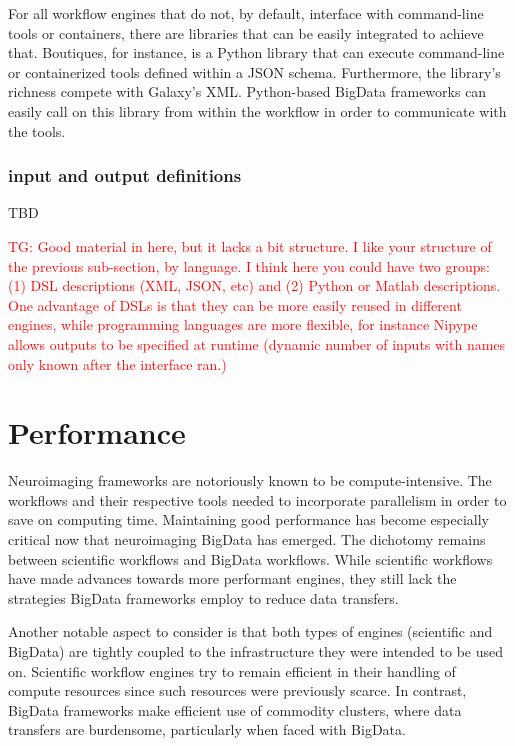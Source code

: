 \documentclass{report}
\newcommand{\tristan}[1]{\textcolor{red}{TG: #1}}
\begin{document}
            For all workflow engines that do not, by default, interface with 
            command-line tools or containers, there are libraries that can be
            easily integrated to achieve that. Boutiques, for instance, is a 
            Python library that can execute command-line or containerized tools
            defined within a JSON schema. Furthermore, the library's richness
            compete with Galaxy's XML. Python-based BigData frameworks can 
            easily call on this library from within the workflow in order to
            communicate with the tools.

            \subsection{input and output definitions}
                TBD

            \tristan{Good material in here, but it lacks a bit structure.
            I like your structure of the previous sub-section, by language. I think
            here you could have two groups: (1) DSL descriptions (XML, JSON, etc) and (2)
            Python or Matlab descriptions. One advantage of DSLs is that they can 
            be more easily reused in different engines, while programming languages
            are more flexible, for instance Nipype allows outputs to be specified
            at runtime (dynamic number of inputs with names only known after
            the interface ran.)}


            
    \chapter{Performance}\label{performance}
        Neuroimaging frameworks are notoriously known to be compute-intensive.
        The workflows and their respective tools needed to incorporate 
        parallelism in order to save on computing time. Maintaining good 
        performance has become especially critical now that neuroimaging
        BigData has emerged. The dichotomy remains between scientific 
        workflows and BigData workflows. While scientific workflows have made
        advances towards more performant engines, they still lack the 
        strategies BigData frameworks employ to reduce data transfers. 
        
        Another notable aspect to consider is that both types of engines 
        (scientific and BigData) are tightly coupled to the infrastructure
        they were intended to be used on. Scientific workflow engines
        try to remain efficient in their handling of compute resources since such
        resources were previously scarce. In contrast, BigData frameworks 
        make efficient use of commodity clusters, where data transfers are 
        burdensome, particularly when faced with BigData.
\end{document}
